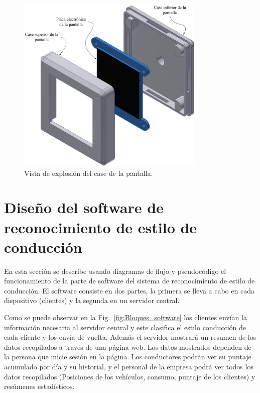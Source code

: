 \begin{figure}[hbt!]
\centering
\includegraphics[width=0.8\textwidth]{exploded_2.pdf}
\caption{Vista de explosión del case de la pantalla.}
\label{fig:exploded_pantalla}
\end{figure}

\newpage

\section{Diseño del software de reconocimiento de estilo de conducción}

En esta sección se describe usando diagramas de flujo y pseudocódigo el funcionamiento de la parte de software del sistema de reconocimiento de estilo de conducción. El software consiste en dos partes, la primera se lleva a cabo en cada dispositivo (clientes) y la segunda en un servidor central.

Como se puede observar en la Fig.~\ref{fig:Bloques_software} los clientes envían la información necesaria al servidor central y este clasifica el estilo conducción de cada cliente y los envía de vuelta. Además el servidor mostrará un resumen de los datos recopilados a través de una página web. Los datos mostrados dependen de la persona que inicie sesión en la página. Los conductores podrán ver su puntaje acumulado por día y su historial, y el personal de la empresa podrá ver todos los datos recopilados (Posiciones de los vehículos, consumo, puntaje de los clientes) y resúmenes estadísticos.


